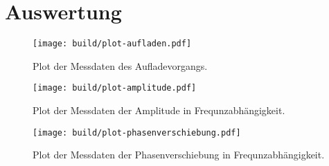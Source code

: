 \section{Auswertung}
\label{sec:Auswertung}

\begin{figure}
    \centering
    \texttt{[image: build/plot-aufladen.pdf]}
    \caption{Plot der Messdaten des Aufladevorgangs.}
    \label{fig:aufladen}
\end{figure}

\begin{figure}
    \centering
    \texttt{[image: build/plot-amplitude.pdf]}
    \caption{Plot der Messdaten der Amplitude in Frequnzabhängigkeit.}
    \label{fig:amplitude}
\end{figure}

\begin{figure}
    \centering
    \texttt{[image: build/plot-phasenverschiebung.pdf]}
    \caption{Plot der Messdaten der Phasenverschiebung in Frequnzabhängigkeit.}
    \label{fig:phasenverschiebung}
\end{figure}